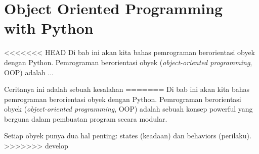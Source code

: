 
\chapter{Object Oriented Programming with Python}

<<<<<<< HEAD
Di bab ini akan kita bahas pemrograman berorientasi obyek dengan Python. Pemrograman berorientasi obyek (\emph{object-oriented programming}, OOP) adalah ...

Ceritanya ini adalah sebuah kesalahan
=======
Di bab ini akan kita bahas pemrograman berorientasi obyek dengan Python. Pemrograman berorientasi obyek (\emph{object-oriented programming}, OOP) adalah sebuah konsep powerful yang berguna dalam pembuatan program secara modular.

Setiap obyek punya dua hal penting: states (keadaan) dan behaviors (perilaku).
>>>>>>> develop


